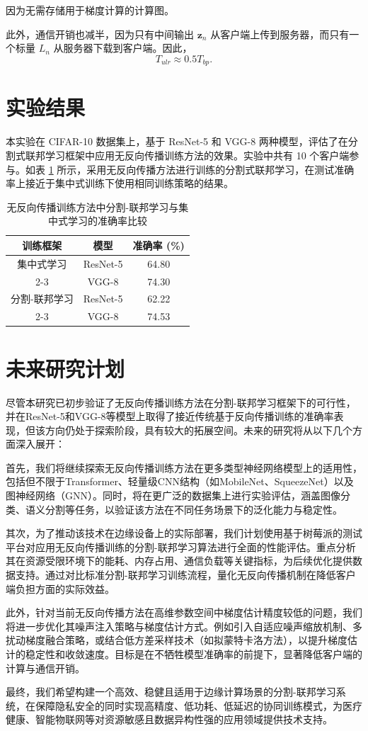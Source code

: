 因为无需存储用于梯度计算的计算图。

此外，通信开销也减半，因为只有中间输出 $ \mathbf{z}_n $ 从客户端上传到服务器，而只有一个标量 $ L_n $ 从服务器下载到客户端。因此，
\begin{equation}
    T_{ulr} \approx 0.5 T_{bp}.
\end{equation}

\section{实验结果}
本实验在 CIFAR-10 数据集上，基于 ResNet-5 和 VGG-8 两种模型，评估了在分割式联邦学习框架中应用无反向传播训练方法的效果。实验中共有 10 个客户端参与。如表 \ref{tab:bpfree} 所示，采用无反向传播方法进行训练的分割式联邦学习，在测试准确率上接近于集中式训练下使用相同训练策略的结果。
\begin{table}[t]
\centering
\caption{无反向传播训练方法中分割-联邦学习与集中式学习的准确率比较}
\label{tab:bpfree n=10}
\begin{tabular}{c|cc}
\hline
\textbf{训练框架} & \textbf{模型} & \textbf{准确率 (\%)} \\ \hline
集中式学习 & ResNet-5 & 64.80 \\ \cline{2-3}
& VGG-8 & 74.30 \\ \hline
分割-联邦学习 & ResNet-5 & 62.22 \\ \cline{2-3}
& VGG-8 & 74.53 \\ \hline
\end{tabular}\label{tab:bpfree}
\end{table}

\section{未来研究计划}
尽管本研究已初步验证了无反向传播训练方法在分割-联邦学习框架下的可行性，并在ResNet-5和VGG-8等模型上取得了接近传统基于反向传播训练的准确率表现，但该方向仍处于探索阶段，具有较大的拓展空间。未来的研究将从以下几个方面深入展开：

首先，我们将继续探索无反向传播训练方法在更多类型神经网络模型上的适用性，包括但不限于Transformer、轻量级CNN结构（如MobileNet、SqueezeNet）以及图神经网络（GNN）。同时，将在更广泛的数据集上进行实验评估，涵盖图像分类、语义分割等任务，以验证该方法在不同任务场景下的泛化能力与稳定性。

其次，为了推动该技术在边缘设备上的实际部署，我们计划使用基于树莓派的测试平台对应用无反向传播训练的分割-联邦学习算法进行全面的性能评估。重点分析其在资源受限环境下的能耗、内存占用、通信负载等关键指标，为后续优化提供数据支持。通过对比标准分割-联邦学习训练流程，量化无反向传播机制在降低客户端负担方面的实际效益。

此外，针对当前无反向传播方法在高维参数空间中梯度估计精度较低的问题，我们将进一步优化其噪声注入策略与梯度估计方式。例如引入自适应噪声缩放机制、多扰动梯度融合策略，或结合低方差采样技术（如拟蒙特卡洛方法），以提升梯度估计的稳定性和收敛速度。目标是在不牺牲模型准确率的前提下，显著降低客户端的计算与通信开销。

最终，我们希望构建一个高效、稳健且适用于边缘计算场景的分割-联邦学习系统，在保障隐私安全的同时实现高精度、低功耗、低延迟的协同训练模式，为医疗健康、智能物联网等对资源敏感且数据异构性强的应用领域提供技术支持。

